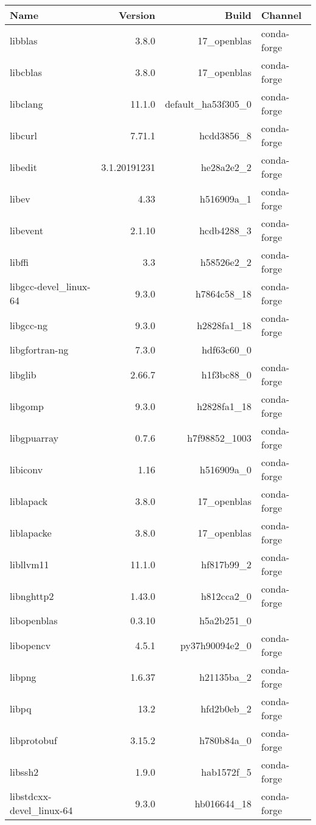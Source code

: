 \begin{table}
	\begin{center}
		\begin{tabular}{|l|r|r|l|}
			\textbf{Name} &\textbf{Version} &\textbf{Build} &\textbf{Channel} \\
			\hline
			libblas &3.8.0 & 17\_openblas &conda-forge \\
			libcblas &3.8.0 & 17\_openblas &conda-forge \\
			libclang &11.1.0 & default\_ha53f305\_0 & conda-forge \\
			libcurl &7.71.1 & hcdd3856\_8 &conda-forge \\
			libedit &3.1.20191231 & he28a2e2\_2 &conda-forge \\
			libev &4.33 & h516909a\_1 &conda-forge \\
			libevent &2.1.10 & hcdb4288\_3 &conda-forge \\
			libffi &3.3 & h58526e2\_2 &conda-forge \\
			libgcc-devel\_linux-64 &9.3.0 & h7864c58\_18 &conda-forge \\
			libgcc-ng &9.3.0 & h2828fa1\_18 &conda-forge \\
			libgfortran-ng &7.3.0 & hdf63c60\_0 & \\
			libglib &2.66.7 & h1f3bc88\_0 &conda-forge \\
			libgomp &9.3.0 & h2828fa1\_18 &conda-forge \\
			libgpuarray &0.7.6 & h7f98852\_1003 &conda-forge \\
			libiconv &1.16 & h516909a\_0 &conda-forge \\
			liblapack &3.8.0 & 17\_openblas &conda-forge \\
			liblapacke &3.8.0 & 17\_openblas &conda-forge \\
			libllvm11 &11.1.0 & hf817b99\_2 &conda-forge \\
			libnghttp2 &1.43.0 & h812cca2\_0 &conda-forge \\
			libopenblas &0.3.10 & h5a2b251\_0 & \\
			libopencv &4.5.1 & py37h90094e2\_0 &conda-forge \\
			libpng &1.6.37 & h21135ba\_2 &conda-forge \\
			libpq &13.2 & hfd2b0eb\_2 &conda-forge \\
			libprotobuf &3.15.2 & h780b84a\_0 &conda-forge \\
			libssh2 &1.9.0 & hab1572f\_5 &conda-forge \\
			libstdcxx-devel\_linux-64 &9.3.0 & hb016644\_18 &conda-forge \\

\end{tabular}
\end{center}
\end{table}

